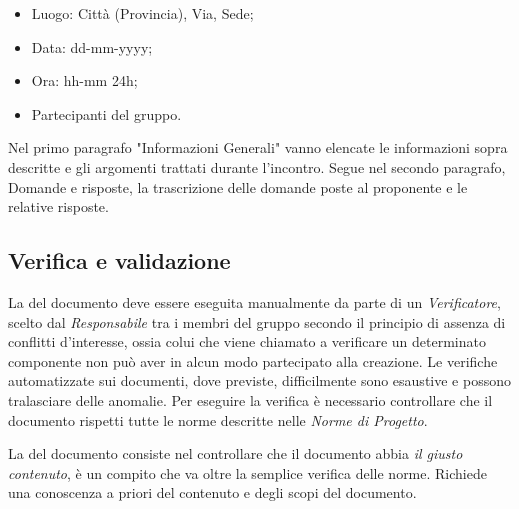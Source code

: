 	\begin{itemize}
		\item Luogo: Città (Provincia), Via, Sede;
		\item Data: dd-mm-yyyy;
		\item Ora: hh-mm 24h;
		\item Partecipanti del gruppo.
	\end{itemize}
	
	Nel primo paragrafo "Informazioni Generali" vanno elencate le informazioni sopra descritte e gli argomenti trattati durante l'incontro. Segue nel secondo paragrafo, Domande e risposte, la trascrizione delle domande poste al proponente e le relative risposte.
	
\subsection{Verifica e validazione}

La \textbf{} del documento deve essere eseguita manualmente da parte di un \textit{Verificatore}, scelto dal \textit{Responsabile} tra i membri del gruppo secondo il principio di assenza di conflitti d'interesse, ossia colui che viene chiamato a verificare un determinato componente non può aver in alcun modo partecipato alla creazione. Le verifiche automatizzate sui documenti, dove previste, difficilmente sono esaustive e possono tralasciare delle anomalie. Per eseguire la verifica è necessario controllare che il documento rispetti tutte le norme descritte nelle \textit{Norme di Progetto}.

La \textbf{} del documento consiste nel controllare che il documento abbia \textit{il giusto contenuto}, è un compito che va oltre la semplice verifica delle norme. Richiede una conoscenza a priori del contenuto e degli scopi del documento.
	

